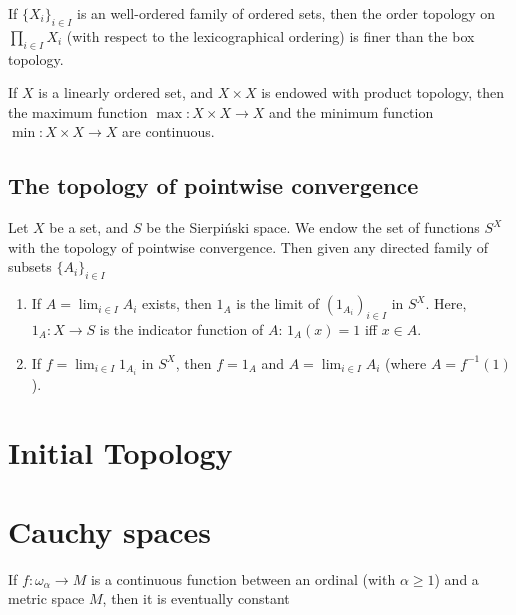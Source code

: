 \documentclass{treatise}
\begin{document}
\begin{shaded}
\begin{proposition}
\begin{enumerate}
\end{enumerate}
\end{proposition}
\begin{proposition}
If $\{ X_i \}_{i \in I}$ is an well-ordered family of ordered sets, then the order topology on $\prod_{i \in I} X_i$ (with respect to the lexicographical ordering) is finer than the box topology.
\end{proposition}
\begin{proposition}
If $X$ is a linearly ordered set, and $X \times X$ is endowed with product topology, then the maximum function $\max : X \times X \to X$ and the minimum function $\min : X \times X \to X$ are continuous.
\end{proposition}

\subsection{The topology of pointwise convergence}
\begin{theorem}
Let $X$ be a set, and $S$ be the Sierpiński space. We endow the set of functions $S^X$ with the topology of pointwise convergence. Then given any directed family of subsets $\{ A_i \}_{i \in I}$
\begin{enumerate}
    \item If $A = \lim_{i \in I} A_i$ exists, then $1_A$ is the limit of $(1_{A_i})_{i \in I}$ in $S^X$. Here, $1_A: X \to S$ is the indicator function of $A$: $1_A (x) = 1$ iff $x \in A$.
    \item If $f = \lim_{i \in I} 1_{A_i}$ in $S^X$, then $f = 1_A$ and $A = \lim_{i \in I} A_i$ (where $A = f^{-1}(1)$).
\end{enumerate}
\end{theorem}

\newpage

\section{Initial Topology}

\section{Cauchy spaces}
\begin{theorem}
If $f: \omega_\alpha \to M$ is a continuous function between an ordinal (with $\alpha \geq 1$) and a metric space $M$, then it is eventually constant
\end{theorem}


\end{shaded}
\end{document}
